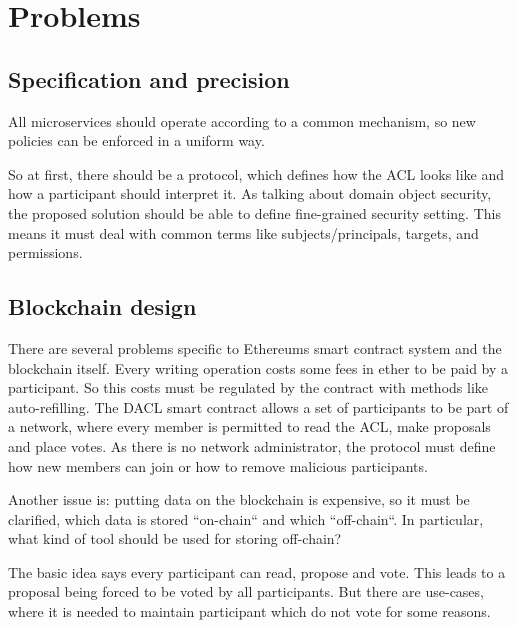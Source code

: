 \documentclass[12pt, conference]{IEEEtran}
\begin{document}
\section{Problems}

\subsection{Specification and precision}
All microservices should operate according to a common mechanism, so new policies can be enforced in a uniform way.

So at first, there should be a protocol, which defines how the ACL looks like and how a participant should interpret it. As talking about domain object security, the proposed solution should be able to define fine-grained security setting. This means it must deal with common terms like subjects/principals, targets, and permissions.

\subsection{Blockchain design}
There are several problems specific to Ethereums smart contract system and the blockchain itself. Every writing operation costs some fees in ether to be paid by a participant. So this costs must be regulated by the contract with methods like auto-refilling.
The DACL smart contract allows a set of participants to be part of a network, where every member is permitted to read the ACL, make proposals and place votes. As there is no network administrator, the protocol must define how new members can join or how to remove malicious participants.

Another issue is: putting data on the blockchain is expensive, so it must be clarified, which data is stored ``on-chain`` and which ``off-chain``. In particular, what kind of tool should be used for storing off-chain?

The basic idea says every participant can read, propose and vote. This leads to a proposal being forced to be voted by all participants. But there are use-cases, where it is needed to maintain participant which do not vote for some reasons. 
\end{document}
